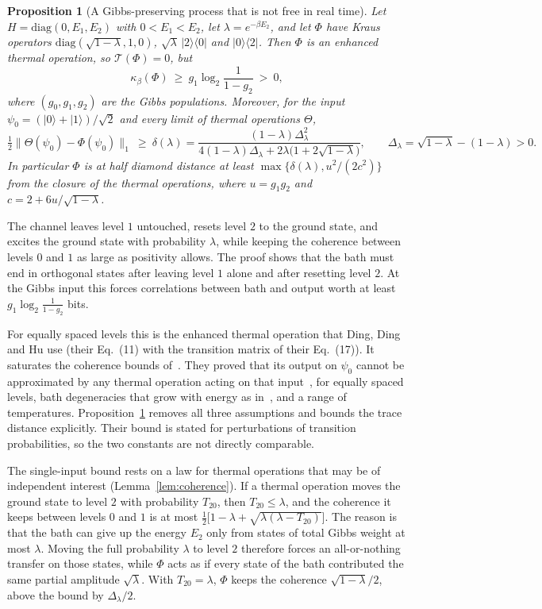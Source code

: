 \documentclass[11pt]{article}
\newtheorem{proposition}[theorem]{Proposition}
\theoremstyle{definition}
\theoremstyle{remark}
\newcommand{\Tcap}{\mathcal T}
\newcommand{\Trt}{\kappa_\beta}
\begin{document}
\begin{proposition}[A Gibbs-preserving process that is not free in real time]\label{prop:qutrit}
Let $H=\mathrm{diag}(0,E_1,E_2)$ with $0<E_1<E_2$, let $\lambda=e^{-\beta E_2}$, and let $\Phi$ have Kraus operators $\mathrm{diag}(\sqrt{1-\lambda},1,0)$, $\sqrt\lambda\,|2\rangle\langle0|$ and $|0\rangle\langle2|$. Then $\Phi$ is an enhanced thermal operation, so $\Tcap(\Phi)=0$, but
\[
\Trt(\Phi)\ \ge\ g_1\log_2\frac{1}{1-g_2}\ >\ 0,
\]
where $(g_0,g_1,g_2)$ are the Gibbs populations. Moreover, for the input $\psi_0=(|0\rangle+|1\rangle)/\sqrt2$ and every limit of thermal operations $\Theta$,
\[
\tfrac12\bigl\|\Theta(\psi_0)-\Phi(\psi_0)\bigr\|_1\ \ge\ \delta(\lambda)=\frac{(1-\lambda)\Delta_\lambda^2}{4(1-\lambda)\Delta_\lambda+2\lambda\bigl(1+2\sqrt{1-\lambda}\bigr)},\qquad\Delta_\lambda=\sqrt{1-\lambda}-(1-\lambda)>0.
\]
In particular $\Phi$ is at half diamond distance at least $\max\{\delta(\lambda),u^2/(2c^2)\}$ from the closure of the thermal operations, where $u=g_1g_2$ and $c=2+6u/\sqrt{1-\lambda}$.
\end{proposition}

The channel leaves level $1$ untouched, resets level $2$ to the ground state, and excites the ground state with probability $\lambda$, while keeping the coherence between levels $0$ and $1$ as large as positivity allows. The proof shows that the bath must end in orthogonal states after leaving level $1$ alone and after resetting level $2$. At the Gibbs input this forces correlations between bath and output worth at least $g_1\log_2\frac1{1-g_2}$ bits.

For equally spaced levels this is the enhanced thermal operation that Ding, Ding and Hu use (their Eq.~(11) with the transition matrix of their Eq.~(17)). It saturates the coherence bounds of~\cite{Cwiklinski15,Lostaglio15}. They proved that its output on $\psi_0$ cannot be approximated by any thermal operation acting on that input~\cite{DingFengHu21}, for equally spaced levels, bath degeneracies that grow with energy as in~\cite{HorodeckiOppenheim13}, and a range of temperatures. Proposition~\ref{prop:qutrit} removes all three assumptions and bounds the trace distance explicitly. Their bound is stated for perturbations of transition probabilities, so the two constants are not directly comparable.

The single-input bound rests on a law for thermal operations that may be of independent interest (Lemma~\ref{lem:coherence}). If a thermal operation moves the ground state to level $2$ with probability $T_{20}$, then $T_{20}\le\lambda$, and the coherence it keeps between levels $0$ and $1$ is at most $\frac12\bigl[1-\lambda+\sqrt{\lambda(\lambda-T_{20})}\bigr]$. The reason is that the bath can give up the energy $E_2$ only from states of total Gibbs weight at most $\lambda$. Moving the full probability $\lambda$ to level $2$ therefore forces an all-or-nothing transfer on those states, while $\Phi$ acts as if every state of the bath contributed the same partial amplitude $\sqrt\lambda$. With $T_{20}=\lambda$, $\Phi$ keeps the coherence $\sqrt{1-\lambda}/2$, above the bound by $\Delta_\lambda/2$.
\end{document}
